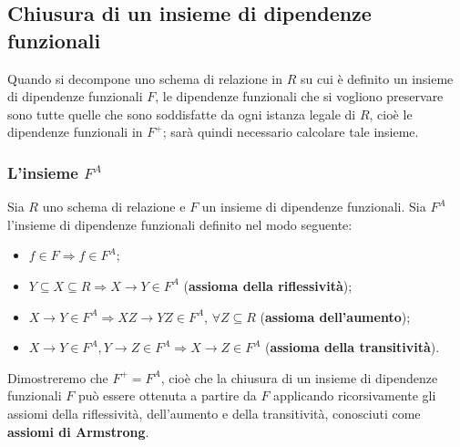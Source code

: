 \subsection{Chiusura di un insieme di dipendenze funzionali}
Quando si decompone uno schema di relazione in $R$ su cui è definito un insieme di 
dipendenze funzionali $F$, le dipendenze funzionali che si vogliono preservare sono
tutte quelle che sono soddisfatte da ogni istanza legale di $R$, cioè le dipendenze
funzionali in $F^+$; sarà quindi necessario calcolare tale insieme.

\subsubsection{L'insieme $F^A$}
\begin{defn}
Sia $R$ uno schema di relazione e $F$ un insieme di dipendenze funzionali. Sia $F^A$ l'insieme
di dipendenze funzionali definito nel modo seguente:
\begin{itemize}
 \item $f \in F \Rightarrow f \in F^A$;
 \item $Y \subseteq X \subseteq R \Rightarrow X\rightarrow Y \in F^A$ (\textbf{assioma della riflessività});
 \item $X \rightarrow Y \in F^A \Rightarrow XZ\rightarrow YZ \in F^A$, $\forall Z\subseteq R$ 
 (\textbf{assioma dell'aumento});
 \item $X \rightarrow Y \in F^A, Y \rightarrow Z \in F^A \Rightarrow X \rightarrow Z \in F^A$ 
 (\textbf{assioma della transitività}).
\end{itemize}
\end{defn}
Dimostreremo che $F^+=F^A$, cioè che la chiusura di un insieme di dipendenze funzionali $F$ può essere
ottenuta a partire da $F$ applicando ricorsivamente gli assiomi della riflessività, dell'aumento e della
transitività, conosciuti come \textbf{assiomi di Armstrong}.

